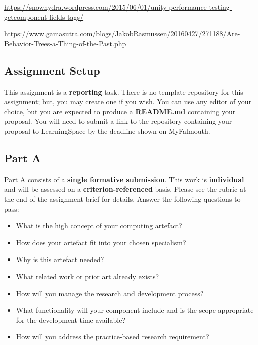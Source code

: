 \documentclass{../../fal_assignment}
\begin{document}
\begin{sloppypar}
\url{https://snowhydra.wordpress.com/2015/06/01/unity-performance-testing-getcomponent-fields-tags/} 

\href{https://www.gamasutra.com/blogs/JakobRasmussen/20160427/271188/Are_Behavior_Trees_a_Thing_of_the_Past.php}{https://www.gamasutra.com/blogs/JakobRasmussen/20160427/271188/Are-Behavior-Trees-a-Thing-of-the-Past.php}
\end{sloppypar}


\subsection*{Assignment Setup}

This assignment is a \textbf{reporting} task. There is no template repository for this assignment; but, you may create one if you wish. You can use any editor of your choice, but you are expected to produce a \textbf{README.md} containing your proposal. You will need to submit a link to the repository containing your proposal to LearningSpace by the deadline shown on MyFalmouth.


\subsection*{Part A}

Part A consists of a \textbf{single formative submission}. This work is \textbf{individual} and will be assessed on a \textbf{criterion-referenced} basis. Please see the rubric at the end of the assignment brief for details. Answer the following questions to pass:

\begin{itemize}
	\item What is the high concept of your computing artefact?
	\item How does your artefact fit into your chosen specialism?
	\item Why is this artefact needed?
	\item What related work or prior art already exists?
	\item How will you manage the research and development process?
	\item What functionality will your component include and is the scope appropriate for the development time available?
	\item How will you address the practice-based research requirement?
\end{itemize}
\end{document}

